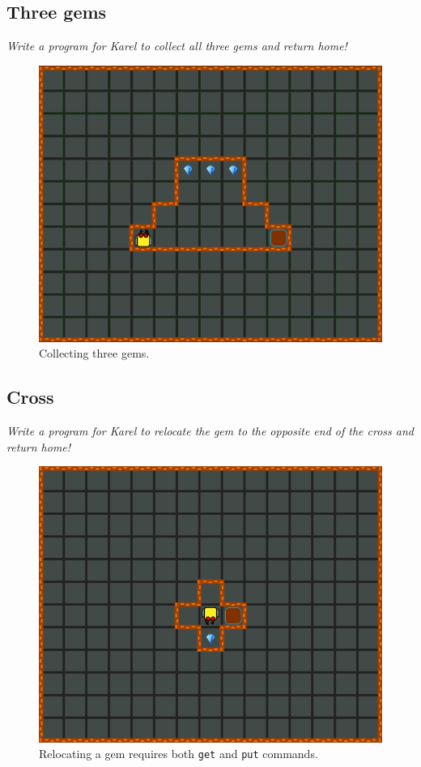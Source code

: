 {{\subsection{Three gems}

{\em Write a program for Karel to collect all three gems and return home!}

\vspace{-3mm}
\begin{figure}[!ht]
\begin{center}
\includegraphics[height=0.4\textwidth]{img/a26.png}
\end{center}
\vspace{-4mm}
\caption{Collecting three gems.}
\label{fig:a26}
\vspace{-4mm}
\end{figure}



\subsection{Cross}

{\em Write a program for Karel to relocate the gem to the opposite 
end of the cross and return home!}

\begin{figure}[!ht]
\begin{center}
\includegraphics[height=0.4\textwidth]{img/b04.png}
\end{center}
\vspace{-4mm}
\caption{Relocating a gem requires both {\tt get} and {\tt put} commands.}
\label{fig:b04}
\vspace{-1cm}
\end{figure}

}}
